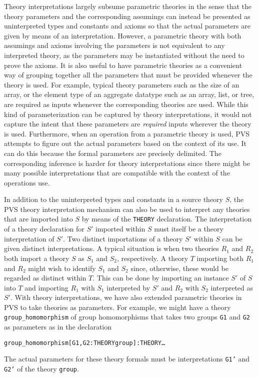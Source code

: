 \documentclass[11pt,twoside,openright,titlepage]{cslreport}
\begin{document}
Theory interpretations largely subsume parametric theories in the sense
that the theory parameters and the corresponding assumings can instead be
presented as uninterpreted types and constants and axioms so that the
actual parameters are given by means of an interpretation.  However, a
parametric theory with both assumings and axioms involving the parameters
is not equivalent to any interpreted theory, as the parameters may be
instantiated without the need to prove the axioms.  It is also useful to
have parametric theories as a convenient way of grouping together all the
parameters that must be provided whenever the theory is used.  For
example, typical theory parameters such as the size of an array, or the
element type of an aggregate datatype such as an array, list, or tree, are
required as inputs whenever the corresponding theories are used.  While
this kind of parameterization can be captured by theory interpretations,
it would not capture the intent that these parameters are \emph{required}
inputs wherever the theory is used.  Furthermore, when an operation from a
parametric theory is used, PVS attempts to figure out the actual
parameters based on the context of its use.  It can do this because the
formal parameters are precisely delimited.  The corresponding inference is
harder for theory interpretations since there might be many possible
interpretations that are compatible with the context of the operations
use.

In addition to the uninterpreted types and constants in a source theory
$S$, the PVS theory interpretation mechanism can also be used to interpret
any theories that are imported into $S$ by means of the \texttt{THEORY}
declaration.  The interpretation of a theory declaration for $S'$ imported
within $S$ must itself be a theory interpretation of $S'$\@.  Two distinct
importations of a theory $S'$ within $S$ can be given distinct
interpretations.  A typical situation is when two theories $R_1$ and $R_2$
both import a theory $S$ as $S_1$ and $S_2$, respectively.  A theory $T$
importing both $R_1$ and $R_2$ might wish to identify $S_1$ and $S_2$
since, otherwise, these would be regarded as distinct within $T$\@.  This
can be done by importing an instance $S'$ of $S$ into $T$ and importing
$R_1$ with $S_1$ interpreted by $S'$ and $R_2$ with $S_2$ interpreted as
$S'$\@.  With theory interpretations, we have also extended parametric
theories in PVS to take theories as parameters.  For example, we might
have a theory \texttt{group\_homomorphism} of group homomorphisms that
takes two groups \texttt{G1} and \texttt{G2} as parameters as in the
declaration
\begin{alltt}
 group_homomorphism[G1, G2: THEORY group]: THEORY \ldots
\end{alltt}
The actual parameters for these theory formals must be
interpretations \texttt{G1'} and \texttt{G2'}
of the theory \texttt{group}\@.
\end{document}
